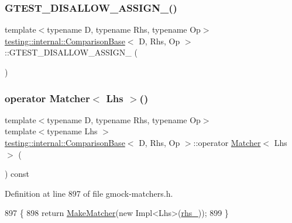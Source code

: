 \subsubsection{\texorpdfstring{G\+T\+E\+S\+T\+\_\+\+D\+I\+S\+A\+L\+L\+O\+W\+\_\+\+A\+S\+S\+I\+G\+N\+\_\+()}{GTEST\_DISALLOW\_ASSIGN\_()}}
{\footnotesize\ttfamily template$<$typename D, typename Rhs, typename Op$>$ \\
\hyperlink{classtesting_1_1internal_1_1ComparisonBase}{testing\+::internal\+::\+Comparison\+Base}$<$ D, Rhs, Op $>$\+::G\+T\+E\+S\+T\+\_\+\+D\+I\+S\+A\+L\+L\+O\+W\+\_\+\+A\+S\+S\+I\+G\+N\+\_\+ (\begin{DoxyParamCaption}\item[{\hyperlink{classtesting_1_1internal_1_1ComparisonBase}{Comparison\+Base}$<$ D, Rhs, Op $>$}]{ }\end{DoxyParamCaption})\hspace{0.3cm}{\ttfamily [private]}}

\mbox{\label{classtesting_1_1internal_1_1ComparisonBase_a071cdd47406c2e8df9c89bb99302eab9}} 
\subsubsection{\texorpdfstring{operator Matcher$<$ Lhs $>$()}{operator Matcher< Lhs >()}}
{\footnotesize\ttfamily template$<$typename D, typename Rhs, typename Op$>$ \\
template$<$typename Lhs $>$ \\
\hyperlink{classtesting_1_1internal_1_1ComparisonBase}{testing\+::internal\+::\+Comparison\+Base}$<$ D, Rhs, Op $>$\+::operator \hyperlink{classtesting_1_1Matcher}{Matcher}$<$ Lhs $>$ (\begin{DoxyParamCaption}{ }\end{DoxyParamCaption}) const\hspace{0.3cm}{\ttfamily [inline]}}



Definition at line 897 of file gmock-\/matchers.\+h.


\begin{DoxyCode}
897                                 \{
898     \textcolor{keywordflow}{return} \hyperlink{namespacetesting_a37fd8029ac00e60952440a3d9cca8166}{MakeMatcher}(\textcolor{keyword}{new} Impl<Lhs>(\hyperlink{classtesting_1_1internal_1_1ComparisonBase_ad5d76d60c4599bbdf3da2b2c07e6169d}{rhs\_}));
899   \}
\end{DoxyCode}


